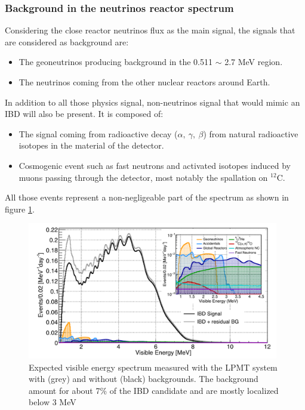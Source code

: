 \subsubsection{Background in the neutrinos reactor spectrum}

Considering the close reactor neutrinos flux as the main signal, the signals that are considered as background are:
\begin{itemize}
  \item The geoneutrinos producing background in the 0.511 $\sim$ 2.7 MeV region.
  \item The neutrinos coming from the other nuclear reactors around Earth.
\end{itemize}
In addition to all those physics signal, non-neutrinos signal that would mimic an IBD will also be present. It is composed of:
\begin{itemize}
  \item The signal coming from radioactive decay ($\alpha, ~ \gamma, ~ \beta$) from natural radioactive isotopes in the material of the detector.
  \item Cosmogenic event such as fast neutrons and activated isotopes induced by muons passing through the detector, most notably the spallation on $^12$C.
\end{itemize}
All those events represent a non-negligeable part of the spectrum as shown in figure \ref{fig:spectrum_with_background}.

\begin{figure}[ht]
  \centering
  \includegraphics[height=6cm]{images/juno/spectrum_with_background.png}
  \caption{Expected visible energy spectrum measured with the LPMT system with (grey) and without (black) backgrounds. The background amount for about 7\% of the IBD candidate and are mostly localized below 3 MeV \cite{juno_collaboration_sub-percent_2022}}
  \label{fig:spectrum_with_background}
\end{figure}


